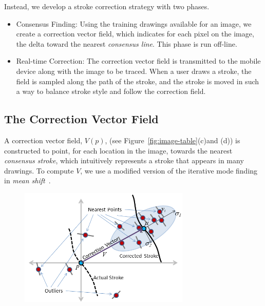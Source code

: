 Instead, we develop a stroke correction strategy with two phases.
\begin{itemize}
\item Consensus Finding: Using the training drawings available for an image, we create a correction vector field, which indicates for each pixel on the image, the delta toward the nearest {\em consensus line}.  This phase is run off-line.
\item Real-time Correction: The correction vector field is transmitted to the mobile device along with the image to be traced.  When a user draws a stroke, the field is sampled along the path of the stroke, and the stroke is moved in such a way to balance stroke style and follow the correction field.
\end{itemize}

\subsection{The Correction Vector Field}


A correction vector field, $V(p)$, (see Figure~\ref{fig:image-table}(c)and (d)) is constructed to point, for each location in the image, towards the nearest {\em consensus stroke}, which intuitively represents a stroke that appears in many drawings. To compute $V$, we use a modified version of the iterative mode finding in {\em mean shift}~\cite{10.1109/ICCV.1999.790416}.


\begin{figure}
  \centering%
  \includegraphics[width=3.2in]{ellipse.png}
  \caption{  }
  \label{fig:ellipse}
\end{figure}


